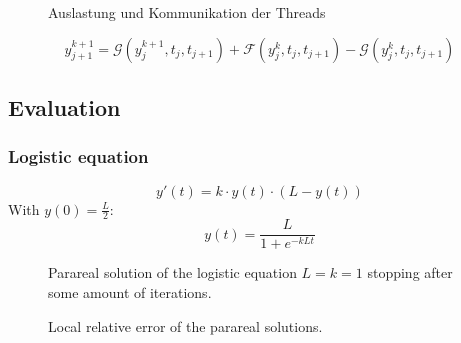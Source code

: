 \begin{frame}
\begin{figure}[ht]
    \centering
    \caption{Auslastung und Kommunikation der Threads}
    \label{fig:sequence}
\end{figure}
\begin{equation*}
y_{j+1}^{k+1} = \mathcal{G}\!\!\left(y_j^{k+1}, t_j, t_{j+1}\right) + \mathcal{F}\!\!\left(y_j^k, t_j, t_{j+1}\right) - \mathcal{G}\!\!\left(y_j^k, t_j, t_{j+1}\right)
\end{equation*}
\end{frame}

\subsection{Evaluation}

\begin{frame}
\frametitle{Logistic equation}
\begin{equation*}
    y'(t) = k \cdot y(t) \cdot (L - y(t))
\end{equation*}
With \(y(0)= \frac{L}{2}\):
\begin{equation*}
    y(t) = \frac{L}{1+e^{-k L t}}
\end{equation*}
\end{frame}

\begin{frame}
    \begin{figure}[ht]
        \centering
        \scalebox{0.8}{}
        \caption{Parareal solution of the logistic equation \(L = k = 1\) stopping after some amount of iterations.}
        \label{fig:iters_log}
    \end{figure}
\end{frame}

\begin{frame}
    \begin{figure}[ht]
        \centering
        \scalebox{0.8}{}
        \caption{Local relative error of the parareal solutions.}
        \label{fig:iters_log}
    \end{figure}
\end{frame}